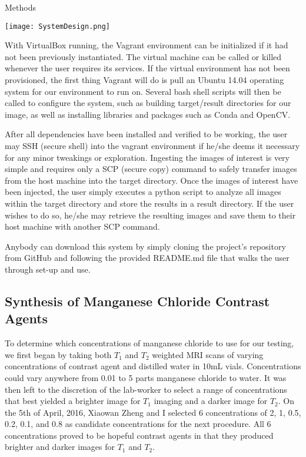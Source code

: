 \documentclass[a4paper,12pt]{article}
\begin{document}
\begin{section}{Methods}
\begin{center}
\texttt{[image: SystemDesign.png]}
\end{center}

With VirtualBox running, the Vagrant environment can be initialized if it had not been previously instantiated. The virtual machine can be called or killed whenever the user requires its services. If the virtual environment has not been provisioned, the first thing Vagrant will do is pull an Ubuntu 14.04 operating system for our environment to run on. Several bash shell scripts will then be called to configure the system, such as building target/result directories for our image, as well as installing libraries and packages such as Conda and OpenCV. 

After all dependencies have been installed and verified to be working, the user may SSH (secure shell) into the vagrant environment if he/she deems it necessary for any minor tweakings or exploration. Ingesting the images of interest is very simple and requires only a SCP (secure copy) command to safely transfer images from the host machine into the target directory. Once the images of interest have been injected, the user simply executes a python script to analyze all images within the target directory and store the results in a result directory. If the user wishes to do so, he/she may retrieve the resulting images and save them to their host machine with another SCP command.

Anybody can download this system by simply cloning the project's repository from GitHub and following the provided README.md file that walks the user through set-up and use.

\subsection{Synthesis of Manganese Chloride Contrast Agents}

To determine which concentrations of manganese chloride to use for our testing, we first began by taking both $T_1$ and $T_2$ weighted MRI scans of varying concentrations of contrast agent and distilled water in 10mL vials. Concentrations could vary anywhere from 0.01 to 5 parts manganese chloride to water. It was then left to the discretion of the lab-worker to select a range of concentrations that best yielded a brighter image for $T_1$ imaging and a darker image for $T_2$. On the 5th of April, 2016, Xiaowan Zheng and I selected 6 concentrations of 2, 1, 0.5, 0.2, 0.1, and 0.8 as candidate concentrations for the next procedure. All 6 concentrations proved to be hopeful contrast agents in that they produced brighter and darker images for $T_1$ and $T_2$.\\


\end{section}
\end{document}
